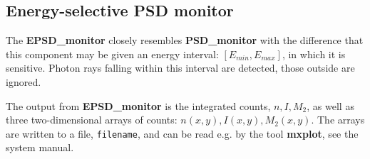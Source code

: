 \subsection*{Energy-selective PSD monitor}

The \textbf{EPSD\_monitor} closely resembles \textbf{PSD\_monitor} with the difference that
this component may be given an energy interval: $\left[E_{min},E_{max}\right]$, in which it is sensitive.
Photon rays falling within this interval are detected, those outside are ignored.

The output from \textbf{EPSD\_monitor} is the integrated counts, $n, I, M_2$,
as well as
three two-dimensional arrays of counts: $n(x,y), I(x,y), M_2(x,y)$.
The arrays are written to a file, \verb+filename+, and can be read e.g. by the tool
\textbf{mxplot}, see the system manual.
  
